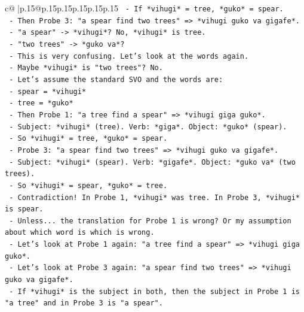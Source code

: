 \documentclass{article}
\begin{document}
{\begin{supertabular}{c@{$\;$}|p{.15\linewidth}@{}p{.15\linewidth}p{.15\linewidth}p{.15\linewidth}p{.15\linewidth}p{.15\linewidth}}
{{{\texttt{                      {-} If *vihugi* = tree, *guko* = spear.} \\
\texttt{                      {-} Then Probe 3: "a spear find two trees" => *vihugi guko va gigafe*.} \\
\texttt{                      {-} "a spear" {-}> *vihugi*? No, *vihugi* is tree.} \\
\texttt{                      {-} "two trees" {-}> *guko va*?} \\
\texttt{                      {-} This is very confusing. Let's look at the words again.} \\
\texttt{                      {-} Maybe *vihugi* is "two trees"? No.} \\
\texttt{                      {-} Let's assume the standard SVO and the words are:} \\
\texttt{                        {-} spear = *vihugi*} \\
\texttt{                        {-} tree = *guko*} \\
\texttt{                      {-} Then Probe 1: "a tree find a spear" => *vihugi giga guko*.} \\
\texttt{                        {-} Subject: *vihugi* (tree). Verb: *giga*. Object: *guko* (spear).} \\
\texttt{                        {-} So *vihugi* = tree, *guko* = spear.} \\
\texttt{                      {-} Probe 3: "a spear find two trees" => *vihugi guko va gigafe*.} \\
\texttt{                        {-} Subject: *vihugi* (spear). Verb: *gigafe*. Object: *guko va* (two trees).} \\
\texttt{                        {-} So *vihugi* = spear, *guko* = tree.} \\
\texttt{                      {-} Contradiction! In Probe 1, *vihugi* was tree. In Probe 3, *vihugi* is spear.} \\
\texttt{                      {-} Unless... the translation for Probe 1 is wrong? Or my assumption about which word is which is wrong.} \\
\texttt{                      {-} Let's look at Probe 1 again: "a tree find a spear" => *vihugi giga guko*.} \\
\texttt{                      {-} Let's look at Probe 3 again: "a spear find two trees" => *vihugi guko va gigafe*.} \\
\texttt{                      {-} If *vihugi* is the subject in both, then the subject in Probe 1 is "a tree" and in Probe 3 is "a spear".} \\
}}}
\end{supertabular}}
\end{document}
